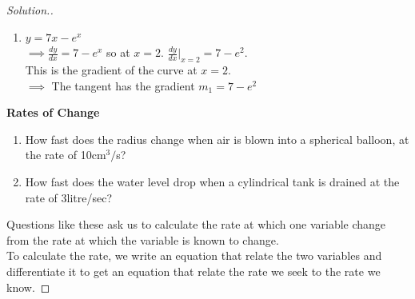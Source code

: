 \documentclass[11pt,a4paper]{article}
\theoremstyle{definition}
\newenvironment{solution}
  {\renewcommand{\qedsymbol}{}\begin{proof}[\textit{Solution}.]}
  {\end{proof}}
\begin{document}
\begin{solution}

\begin{enumerate}
\item[1.(c)] $y=7x-e^{\displaystyle{x}}$\\

$\implies \frac{dy}{dx}=7-e^{\displaystyle{x}}$ so at $x=2$. $\frac{dy}{dx}\Bigg|_{x=2}=7-e^2$.\\
This is the gradient of the curve at $x=2$.\\

$\implies$ The tangent has the gradient $m_1=7-e^2$


\begin{figure}[H]
\centering
{}
\end{figure}
\end{enumerate}
\vspace{0.5cm}








\textbf{Rates of Change}
\begin{enumerate}
\item How fast does the radius change when air is blown into a spherical balloon, at the rate of 10cm$^3/$s?
\item How fast does the water level drop when a cylindrical tank is drained at the rate of 3litre/sec?\\
\end{enumerate}

Questions like these ask us to calculate the rate at which one variable change from the rate at which the variable is known to change.\\
To calculate the rate, we write an equation that relate the two variables and differentiate it to get an equation that relate the rate we seek to the rate we know.
\end{solution}
\end{document}

